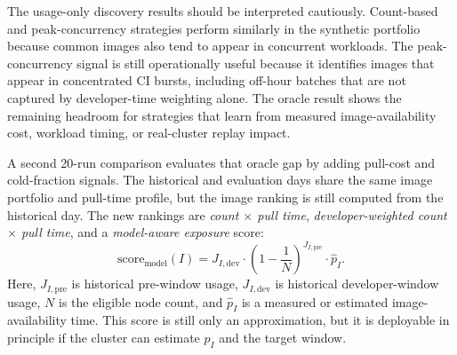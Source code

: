 \documentclass[11pt,a4paper]{article}
\begin{document}
The usage-only discovery results should be interpreted cautiously. Count-based and peak-concurrency strategies perform similarly in the synthetic portfolio because common images also tend to appear in concurrent workloads. The peak-concurrency signal is still operationally useful because it identifies images that appear in concentrated CI bursts, including off-hour batches that are not captured by developer-time weighting alone. The oracle result shows the remaining headroom for strategies that learn from measured image-availability cost, workload timing, or real-cluster replay impact.

A second 20-run comparison evaluates that oracle gap by adding pull-cost and cold-fraction signals. The historical and evaluation days share the same image portfolio and pull-time profile, but the image ranking is still computed from the historical day. The new rankings are \emph{count \(\times\) pull time}, \emph{developer-weighted count \(\times\) pull time}, and a \emph{model-aware exposure} score:
\[
\mathrm{score}_{\mathrm{model}}(I)
=
J_{I,\mathrm{dev}}
\cdot
\left(1-\frac{1}{N}\right)^{J_{I,\mathrm{pre}}}
\cdot
\hat{p}_I .
\]
Here, \(J_{I,\mathrm{pre}}\) is historical pre-window usage, \(J_{I,\mathrm{dev}}\) is historical developer-window usage, \(N\) is the eligible node count, and \(\hat{p}_I\) is a measured or estimated image-availability time. This score is still only an approximation, but it is deployable in principle if the cluster can estimate \(p_I\) and the target window.
\end{document}
